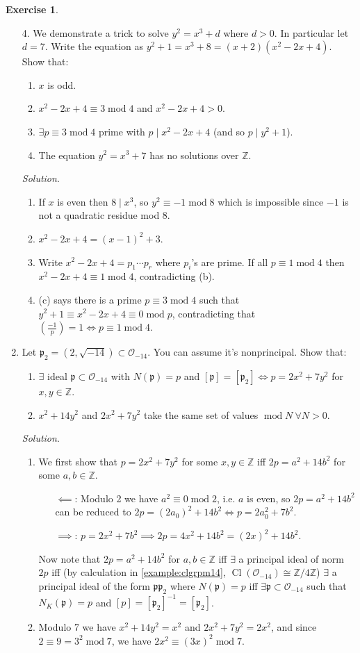 \documentclass{article}
\newcommand{\Z}{\mathbb{Z}}
\newcommand{\Mod}{\operatorname{mod}}
\newcommand{\Cl}{\operatorname{Cl}}
\newcommand{\ri}{\mathcal{O}}
\newcommand{\ip}{\mathfrak{p}}
\theoremstyle{definition}
\newtheorem{exe}[defn]{Exercise}
\begin{document}
\begin{exe}
\begin{enumerate}
\item[4.] We demonstrate a trick to solve $y^2=x^3+d$ where $d>0$. In particular let $d=7$. Write the equation as $y^2+1=x^3+8=(x+2)\left(x^2-2x+4\right)$. Show that:

\begin{enumerate}
\item $x$ is odd.
\item $x^2-2x+4\equiv 3\Mod 4$ and $x^2-2x+4>0$.
\item $\exists p\equiv 3\Mod 4$ prime with $p\mid x^2-2x+4$ (and so $p\mid y^2+1$).
\item The equation $y^2=x^3+7$ has no solutions over $\Z$.
\end{enumerate}

\textit{Solution}. \begin{enumerate}
\item If $x$ is even then $8\mid x^3$, so $y^2\equiv -1\Mod 8$ which is impossible since $-1$ is not a quadratic residue mod 8.
\item $x^2-2x+4=(x-1)^2+3$.
\item Write $x^2-2x+4=p_1\cdots p_r$ where $p_i$'s are prime. If all $p\equiv 1\Mod 4$ then $x^2-2x+4\equiv 1\Mod 4$, contradicting (b).
\item (c) says there is a prime $p\equiv 3\Mod 4$ such that $y^2+1\equiv x^2-2x+4\equiv 0\Mod p$, contradicting that $\left(\frac{-1}{p}\right)=1\iff p\equiv 1\Mod 4$.
\end{enumerate}

\item Let $\ip_2=\left(2,\sqrt{-14}\right)\subset\ri_{-14}$. You can assume it's nonprincipal. Show that:
\begin{enumerate}
\item $\exists$ ideal $\ip\subset\ri_{-14}$ with $N(\ip)=p$ and $[\ip]=[\ip_2]\iff p=2x^2+7y^2$ for $x,y\in\Z$.
\item $x^2+14y^2$ and $2x^2+7y^2$ take the same set of values $\Mod N \ \forall N>0$.
\end{enumerate}

\textit{Solution}. \begin{enumerate}
\item We first show that $p=2x^2+7y^2$ for some $x,y\in\Z$ iff $2p=a^2+14b^2$ for some $a,b\in\Z$.
\begin{itemize}
\item[$\impliedby$:] Modulo 2 we have $a^2\equiv 0\Mod 2$, i.e. $a$ is even, so $2p=a^2+14b^2$ can be reduced to $2p=(2a_0)^2+14b^2\iff p=2a_0^2+7b^2$.
\item[$\implies$:] $p=2x^2+7b^2\implies 2p=4x^2+14b^2=(2x)^2+14b^2$.
\end{itemize}
Now note that $2p=a^2+14b^2$ for $a,b\in\Z$ iff $\exists$ a principal ideal of norm $2p$ iff (by calculation in \ref{example:clgrpm14}, $\Cl(\ri_{-14})\cong\Z/4\Z$) $\exists$ a principal ideal of the form $\ip\ip_2$ where $N(\ip)=p$ iff $\exists\ip\subset\ri_{-14}$ such that $N_K(\ip)=p$ and $[p]=[\ip_2]^{-1}=[\ip_2]$.
\item Modulo 7 we have $x^2+14y^2=x^2$ and $2x^2+7y^2=2x^2$, and since $2\equiv 9=3^2\Mod 7$, we have $2x^2\equiv (3x)^2\Mod 7$.


\end{enumerate}
\end{enumerate}
\end{exe}
\end{document}
